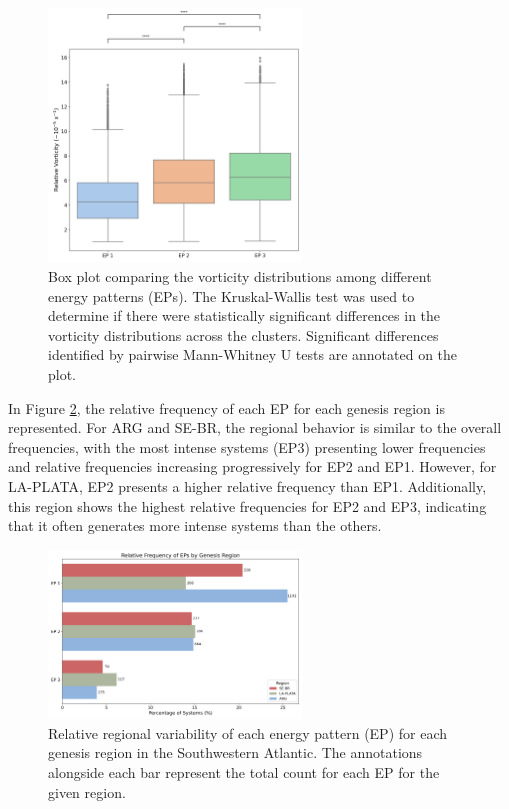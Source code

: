 \begin{figure}[!htbp]
    \centering
    \includegraphics[width=0.6\textwidth]{figs_6/boxplot_vorticity_by_cluster.png}
    \caption[Energy Patterns - Mean Intensity]{Box plot comparing the vorticity distributions among different energy patterns (EPs). The Kruskal-Wallis test was used to determine if there were statistically significant differences in the vorticity distributions across the clusters. Significant differences identified by pairwise Mann-Whitney U tests are annotated on the plot.}
    \label{fig:boxplot_vorticity_by_cluster}
\end{figure}

In Figure \ref{fig:ep_frequencies_by_region}, the relative frequency of each EP for each genesis region is represented. For ARG and SE-BR, the regional behavior is similar to the overall frequencies, with the most intense systems (EP3) presenting lower frequencies and relative frequencies increasing progressively for EP2 and EP1. However, for LA-PLATA, EP2 presents a higher relative frequency than EP1. Additionally, this region shows the highest relative frequencies for EP2 and EP3, indicating that it often generates more intense systems than the others. 

\begin{figure}[!htbp]
    \centering
    \includegraphics[width=0.6\textwidth]{figs_6/ep_frequencies_by_region.png}
    \caption[Energy Patterns - Frequency by Region]{Relative regional variability of each energy pattern (EP) for each genesis region in the Southwestern Atlantic. The annotations alongside each bar represent the total count for each EP for the given region.}
    \label{fig:ep_frequencies_by_region}
\end{figure}


